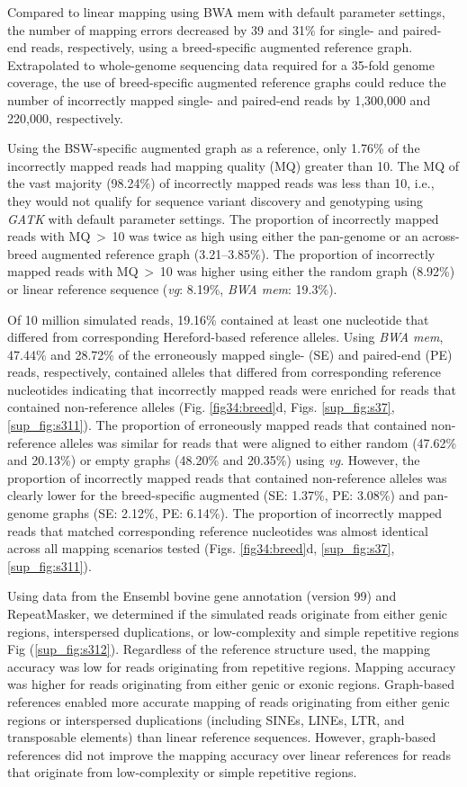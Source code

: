 \documentclass[../main.tex]{subfiles}
\begin{document}
Compared to linear mapping using BWA mem with default parameter settings, the number of mapping errors decreased by 39 and 31\% for single- and paired-end reads, respectively, using a breed-specific augmented reference graph. Extrapolated to whole-genome sequencing data required for a 35-fold genome coverage, the use of breed-specific augmented reference graphs could reduce the number of incorrectly mapped single- and paired-end reads by 1,300,000 and 220,000, respectively.

Using the BSW-specific augmented graph as a reference, only 1.76\% of the incorrectly mapped reads had mapping quality (MQ) greater than 10. The MQ of the vast majority (98.24\%) of incorrectly mapped reads was less than 10, i.e., they would not qualify for sequence variant discovery and genotyping using \emph{GATK} with default parameter settings. The proportion of incorrectly mapped reads with MQ $>$ 10 was twice as high using either the pan-genome or an across-breed augmented reference graph (3.21–3.85\%). The proportion of incorrectly mapped reads with MQ $>$ 10 was higher using either the random graph (8.92\%) or linear reference sequence (\emph{vg}: 8.19\%, \emph{BWA mem}: 19.3\%).

Of 10 million simulated reads, 19.16\% contained at least one nucleotide that differed from corresponding Hereford-based reference alleles. Using \emph{BWA mem}, 47.44\% and 28.72\% of the erroneously mapped single- (SE) and paired-end (PE) reads, respectively, contained alleles that differed from corresponding reference nucleotides indicating that incorrectly mapped reads were enriched for reads that contained non-reference alleles (Fig. \ref{fig34:breed}d, Figs. \ref{sup_fig:s37}, \ref{sup_fig:s311}). The proportion of erroneously mapped reads that contained non-reference alleles was similar for reads that were aligned to either random (47.62\% and 20.13\%) or empty graphs (48.20\% and 20.35\%) using \emph{vg}. However, the proportion of incorrectly mapped reads that contained non-reference alleles was clearly lower for the breed-specific augmented (SE: 1.37\%, PE: 3.08\%) and pan-genome graphs (SE: 2.12\%, PE: 6.14\%). The proportion of incorrectly mapped reads that matched corresponding reference nucleotides was almost identical across all mapping scenarios tested (Figs. \ref{fig34:breed}d, \ref{sup_fig:s37}, \ref{sup_fig:s311}).

Using data from the Ensembl bovine gene annotation (version 99) and RepeatMasker, we determined if the simulated reads originate from either genic regions, interspersed duplications, or low-complexity and simple repetitive regions Fig (\ref{sup_fig:s312}). Regardless of the reference structure used, the mapping accuracy was low for reads originating from repetitive regions. Mapping accuracy was higher for reads originating from either genic or exonic regions. Graph-based references enabled more accurate mapping of reads originating from either genic regions or interspersed duplications (including SINEs, LINEs, LTR, and transposable elements) than linear reference sequences. However, graph-based references did not improve the mapping accuracy over linear references for reads that originate from low-complexity or simple repetitive regions.
\end{document}
